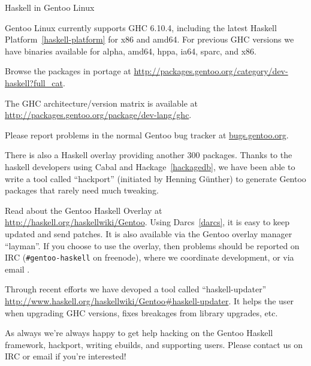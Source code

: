 \begin{hcarentry}[updated]{Haskell in Gentoo Linux}
\label{gentoo}
\makeheader

Gentoo Linux currently supports GHC 6.10.4, including the
latest Haskell Platform~\cref{haskell-platform} for x86 and amd64.
For previous GHC versions we have binaries available for alpha, amd64, hppa,
ia64, sparc, and x86.

Browse the packages in portage at 
\url{http://packages.gentoo.org/category/dev-haskell?full\_cat}.

The GHC architecture/version matrix is available at
\url{http://packages.gentoo.org/package/dev-lang/ghc}.

Please report problems in the normal Gentoo bug tracker
at \url{bugs.gentoo.org}.

There is also a Haskell overlay providing another 300 packages. Thanks to
the haskell developers using Cabal and Hackage~\cref{hackagedb}, we have been
able to write a tool called ``hackport'' (initiated by Henning G\"unther) to
generate Gentoo packages that rarely need much tweaking.

Read about the Gentoo Haskell Overlay at
\url{http://haskell.org/haskellwiki/Gentoo}. Using
Darcs~\cref{darcs}, it is easy to keep updated and send patches.
It is also available via the Gentoo overlay manager ``layman''.
If you choose to use the overlay, then problems should be
reported on
IRC (\verb+#gentoo-haskell+ on freenode), where we coordinate
development, or via email .

Through recent efforts we have devoped a tool called ``haskell-updater''
\url{http://www.haskell.org/haskellwiki/Gentoo#haskell-updater}.
It helps the user when upgrading GHC versions, fixes
breakages from library upgrades, etc.

As always we're always happy to get help hacking on the Gentoo Haskell
framework, hackport, writing ebuilds, and supporting users. Please contact
us on IRC or email if you're interested!
\end{hcarentry}
